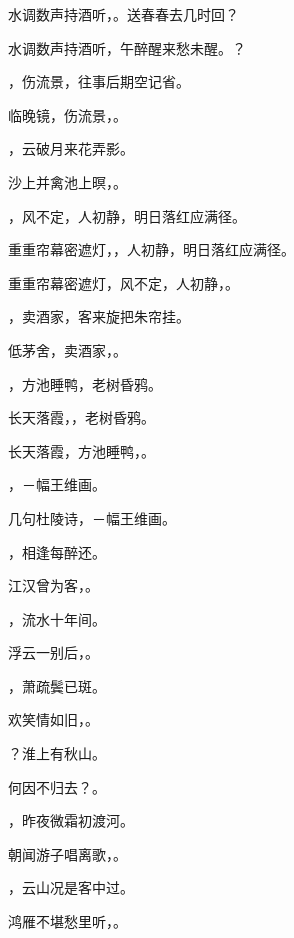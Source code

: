 \documentclass[12pt, a4paper, addpoints, answers]{exam}
\begin{document}
\begin{questions}
\question[3] 水调数声持酒听，。送春春去几时回？

\question[3] 水调数声持酒听，午醉醒来愁未醒。？

\question[3] ，伤流景，往事后期空记省。

\question[3] 临晚镜，伤流景，。

\question[3] ，云破月来花弄影。

\question[3] 沙上并禽池上暝，。

\question[3] ，风不定，人初静，明日落红应满径。

\question[3] 重重帘幕密遮灯，，人初静，明日落红应满径。

\question[3] 重重帘幕密遮灯，风不定，人初静，。

\question[3] ，卖酒家，客来旋把朱帘挂。

\question[3] 低茅舍，卖酒家，。

\question[3] ，方池睡鸭，老树昏鸦。

\question[3] 长天落霞，，老树昏鸦。

\question[3] 长天落霞，方池睡鸭，。

\question[3] ，－幅王维画。

\question[3] 几句杜陵诗，\fillin－幅王维画。

\question[3] ，相逢每醉还。

\question[3] 江汉曾为客，。

\question[3] ，流水十年间。

\question[3] 浮云一别后，。

\question[3] ，萧疏鬓已斑。

\question[3] 欢笑情如旧，。

\question[3] ？淮上有秋山。

\question[3] 何因不归去？。

\question[3] ，昨夜微霜初渡河。

\question[3] 朝闻游子唱离歌，。

\question[3] ，云山况是客中过。

\question[3] 鸿雁不堪愁里听，。


\end{questions}
\end{document}
